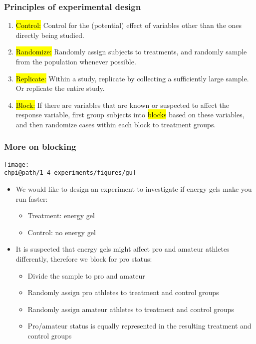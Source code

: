 \documentclass[slidestop,compress,mathserif]{beamer}
\makeatletter
\def\chpi@path{../../Chp 1}  %
\makeatother
\begin{document}

\begin{frame}
\frametitle{Principles of experimental design}

	\begin{enumerate}
		\item \hl{Control:} Control for the (potential) effect of variables other than the ones directly being studied.
		\item \hl{Randomize:} Randomly assign subjects to treatments, and randomly sample from the population whenever possible.
		\item \hl{Replicate:} Within a study, replicate by collecting a sufficiently large sample. Or replicate the entire study.
		\item \hl{Block:} If there are variables that are known or suspected to affect the response variable, first group subjects into \hl{blocks} based on these variables, and then randomize cases within each block to treatment groups.
	\end{enumerate}

\end{frame}


\begin{frame}
	\frametitle{More on blocking}

	{
	\begin{center}
	\texttt{[image: \\chpi@path/1-4\_experiments/figures/gu]}
	\end{center}
	}
	{
	\begin{itemize}
		\item We would like to design an experiment to investigate if energy gels make you run faster:
		\pause
		\begin{itemize}
			\item Treatment: energy gel
			\item Control: no energy gel
		\end{itemize}
		\pause
		\item It is suspected that energy gels might affect pro and amateur athletes differently, therefore we block for pro status:
		\pause
		\begin{itemize}
			\item Divide the sample to pro and amateur
			\item Randomly assign pro athletes to treatment and control groups
			\item Randomly assign amateur athletes to treatment and control groups
			\item Pro/amateur status is equally represented in the resulting treatment and control groups
		\end{itemize}
	\end{itemize}
	}

	\pause

\end{frame}
\end{document}
